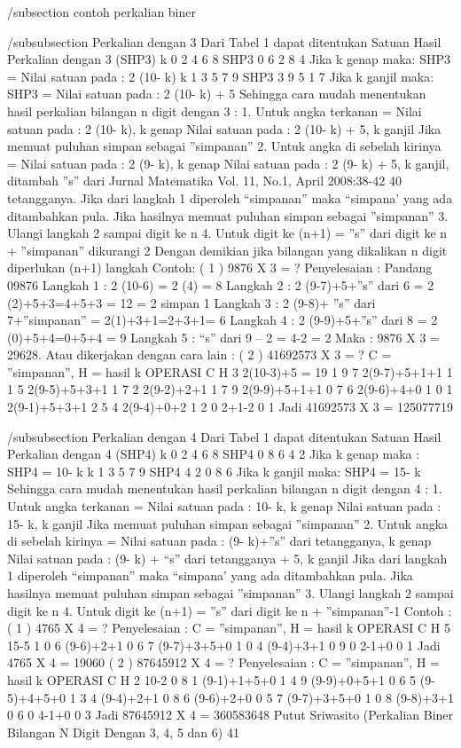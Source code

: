 /subsection {contoh perkalian biner}

/subsubsection {Perkalian dengan 3}
Dari Tabel 1 dapat ditentukan
Satuan Hasil Perkalian dengan 3 (SHP3)
k 0 2 4 6 8
SHP3 0 6 2 8 4
Jika k genap maka:
SHP3 = Nilai satuan pada : 2 (10- k)
k 1 3 5 7 9
SHP3 3 9 5 1 7
Jika k ganjil maka:
SHP3 = Nilai satuan pada : 2 (10- k) + 5
Sehingga cara mudah menentukan hasil
perkalian bilangan n digit dengan 3 :
1. Untuk angka terkanan =
Nilai satuan pada : 2 (10- k), k genap
Nilai satuan pada : 2 (10- k) + 5,
k ganjil
Jika memuat puluhan simpan sebagai
”simpanan”
2. Untuk angka di sebelah kirinya =
Nilai satuan pada : 2 (9- k), k genap
Nilai satuan pada : 2 (9- k) + 5,
k ganjil, ditambah ”s” dari
Jurnal Matematika Vol. 11, No.1, April 2008:38-42
40
tetangganya.
Jika dari langkah 1 diperoleh
“simpanan” maka “simpana’ yang ada
ditambahkan pula.
Jika hasilnya memuat puluhan simpan
sebagai ”simpanan”
3. Ulangi langkah 2 sampai digit ke n
4. Untuk digit ke (n+1) =
”s” dari digit ke n + ”simpanan”
dikurangi 2
Dengan demikian jika bilangan yang
dikalikan n digit diperlukan (n+1) langkah
Contoh:
( 1 ) 9876 X 3 = ?
Penyelesaian : Pandang 09876
Langkah 1 : 2 (10-6) = 2 (4) = 8
Langkah 2 : 2 (9-7)+5+”s” dari 6
= 2 (2)+5+3=4+5+3 = 12
= 2 simpan 1
Langkah 3 : 2 (9-8)+
”s” dari 7+”simpanan”
= 2(1)+3+1=2+3+1= 6
Langkah 4 : 2 (9-9)+5+”s” dari 8
= 2 (0)+5+4=0+5+4 = 9
Langkah 5 : “s” dari 9 – 2 = 4-2 = 2
Maka : 9876 X 3 = 29628.
Atau dikerjakan dengan cara lain :
( 2 ) 41692573 X 3 = ?
C = ”simpanan”, H = hasil
k OPERASI C H
3 2(10-3)+5 = 19 1 9
7 2(9-7)+5+1+1 1 1
5 2(9-5)+5+3+1 1 7
2 2(9-2)+2+1 1 7
9 2(9-9)+5+1+1 0 7
6 2(9-6)+4+0 1 0
1 2(9-1)+5+3+1 2 5
4 2(9-4)+0+2 1 2
0 2+1-2 0 1
Jadi 41692573 X 3 = 125077719

/subsubsection {Perkalian dengan 4}
Dari Tabel 1 dapat ditentukan
Satuan Hasil Perkalian dengan 4 (SHP4)
k 0 2 4 6 8
SHP4 0 8 6 4 2
Jika k genap maka :
SHP4 = 10- k
k 1 3 5 7 9
SHP4 4 2 0 8 6
Jika k ganjil maka:
SHP4 = 15- k
Sehingga cara mudah menentukan hasil
perkalian bilangan n digit dengan 4 :
1. Untuk angka terkanan =
Nilai satuan pada : 10- k, k genap
Nilai satuan pada : 15- k, k ganjil
Jika memuat puluhan simpan sebagai
”simpanan”
2. Untuk angka di sebelah kirinya =
Nilai satuan pada : (9- k)+”s” dari
tetangganya, k genap
Nilai satuan pada : (9- k) + “s” dari
tetangganya + 5, k ganjil
Jika dari langkah 1 diperoleh
“simpanan” maka “simpana’ yang ada
ditambahkan pula.
Jika hasilnya memuat puluhan simpan
sebagai ”simpanan”
3. Ulangi langkah 2 sampai digit ke n
4. Untuk digit ke (n+1) =
”s” dari digit ke n + ”simpanan”-1
Contoh :
( 1 ) 4765 X 4 = ?
Penyelesaian :
C = ”simpanan”, H = hasil
k OPERASI C H
5 15-5 1 0
6 (9-6)+2+1 0 6
7 (9-7)+3+5+0 1 0
4 (9-4)+3+1 0 9
0 2-1+0 0 1
Jadi 4765 X 4 = 19060
( 2 ) 87645912 X 4 = ?
Penyelesaian :
C = ”simpanan”, H = hasil
k OPERASI C H
2 10-2 0 8
1 (9-1)+1+5+0 1 4
9 (9-9)+0+5+1 0 6
5 (9-5)+4+5+0 1 3
4 (9-4)+2+1 0 8
6 (9-6)+2+0 0 5
7 (9-7)+3+5+0 1 0
8 (9-8)+3+1 0 6
0 4-1+0 0 3
Jadi 87645912 X 4 = 360583648
Putut Sriwasito (Perkalian Biner Bilangan N Digit Dengan 3, 4, 5 dan 6)
41

